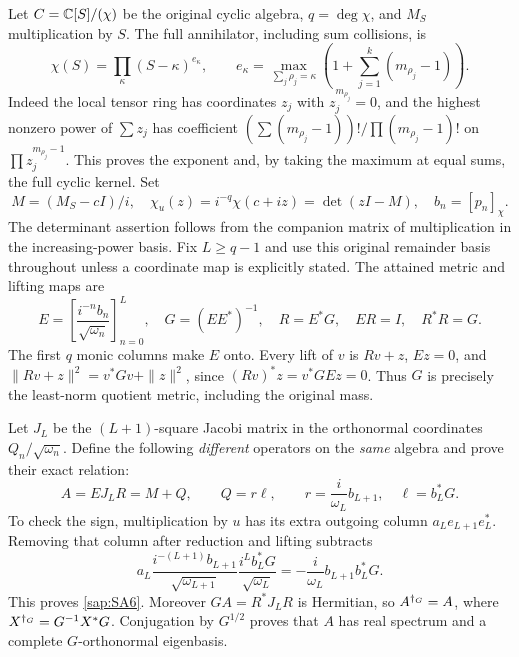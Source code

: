 \documentclass[11pt]{article}
\begin{document}
Let $C=\mathbb C[S]/(\chi)$ be the original cyclic algebra,
$q=\deg\chi$, and $M_S$ multiplication by $S$.
The full annihilator, including sum collisions, is
\begin{equation}\tag{SA3}\label{sap:SA3}
\chi(S)=\prod_\kappa(S-\kappa)^{e_\kappa},
\qquad
e_\kappa=\max_{\sum_j\rho_j=\kappa}
\left(1+\sum_{j=1}^k(m_{\rho_j}-1)\right).
\end{equation}
Indeed the local tensor ring has coordinates $z_j$ with
$z_j^{m_{\rho_j}}=0$, and the highest nonzero power of
$\sum z_j$ has coefficient
$(\sum(m_{\rho_j}-1))!/\prod(m_{\rho_j}-1)!$ on
$\prod z_j^{m_{\rho_j}-1}$. This proves the exponent and,
by taking the maximum at equal sums, the full cyclic kernel.
Set
\begin{equation}\tag{SA4}\label{sap:SA4}
M=(M_S-cI)/i,\quad
\chi_u(z)=i^{-q}\chi(c+iz)=\det(zI-M),\quad b_n=[p_n]_\chi.
\end{equation}
The determinant assertion follows from the companion
matrix of multiplication in the increasing-power basis.
Fix $L\geq q-1$ and use this original remainder basis
throughout unless a coordinate map is explicitly stated.
The attained metric and lifting maps are
\begin{equation}\tag{SA5}\label{sap:SA5}
E=\left[\frac{i^{-n}b_n}{\sqrt{\omega_n}}\right]_{n=0}^L,\quad
G=(EE^*)^{-1},\quad R=E^*G,\quad ER=I,\quad R^*R=G.
\end{equation}
The first $q$ monic columns make $E$ onto. Every lift of
$v$ is $Rv+z$, $Ez=0$, and
$\|Rv+z\|^2=v^*Gv+\|z\|^2$, since
$(Rv)^*z=v^*GEz=0$. Thus $G$ is precisely the least-norm
quotient metric, including the original mass.

Let $J_L$ be the $(L+1)$-square Jacobi matrix in the
orthonormal coordinates $Q_n/\sqrt{\omega_n}$.
Define the following \emph{different} operators on the
\emph{same} algebra and prove their exact relation:
\begin{equation}\tag{SA6}\label{sap:SA6}
A=EJ_LR=M+Q,\qquad
Q=r\ell,\qquad
r=\frac{i}{\omega_L}b_{L+1},\quad \ell=b_L^*G.
\end{equation}
To check the sign, multiplication by $u$ has its extra
outgoing column $a_Le_{L+1}e_L^*$. Removing that column
after reduction and lifting subtracts
\[
a_L\frac{i^{-(L+1)}b_{L+1}}{\sqrt{\omega_{L+1}}}
\frac{i^Lb_L^*G}{\sqrt{\omega_L}}
=-\frac{i}{\omega_L}b_{L+1}b_L^*G.
\]
This proves \eqref{sap:SA6}. Moreover $GA=R^*J_LR$ is
Hermitian, so $A^{\dagger_G}=A$, where $X^{\dagger_G}=G^{-1}X^*G$.
Conjugation by $G^{1/2}$ proves that $A$ has real spectrum
and a complete $G$-orthonormal eigenbasis.
\end{document}
